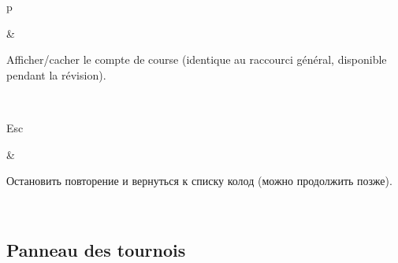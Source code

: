 \documentclass[letterpaper,10pt,russian]{sphinxmanual}
\begin{document}
\begin{savenotes}
\begin{tabular}[t]{}
\begin{varwidth}[t]{}
\sphinxAtStartPar
p
\sphinxbeforeendvarwidth
\end{varwidth}%
&\begin{varwidth}[t]{}
\sphinxAtStartPar
Afficher/cacher le compte de course (identique au raccourci général, disponible pendant la révision).
\sphinxbeforeendvarwidth
\end{varwidth}%
\\
\sphinxhline\begin{varwidth}[t]{}
\sphinxAtStartPar
Esc
\sphinxbeforeendvarwidth
\end{varwidth}%
&\begin{varwidth}[t]{}
\sphinxAtStartPar
Остановить повторение и вернуться к списку колод (можно продолжить позже).
\sphinxbeforeendvarwidth
\end{varwidth}%
\\
\sphinxbottomrule
\end{tabular}
\sphinxtableafterendhook\par
\sphinxattableend\end{savenotes}


\subsection{Panneau des tournois}
\label{\detokenize{raccourcis:panneau-des-tournois}}\label{\detokenize{raccourcis:raccourcis-tournament-panel}}
\end{document}
